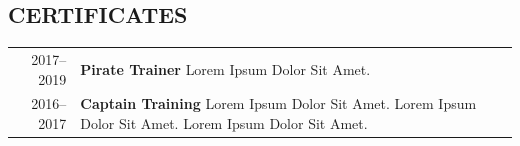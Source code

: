 \documentclass[11pt]{article}
\begin{document}
\vspace{2em}

        \subsection{CERTIFICATES} %
        \begin{tabular}{r p{}}
                {2017--2019} %
                & \textbf{Pirate Trainer} \newline %
                {Lorem Ipsum Dolor Sit Amet.} \\ %
                {2016--2017} %
                & \textbf{Captain Training} \newline %
                {Lorem Ipsum Dolor Sit Amet. Lorem Ipsum Dolor Sit Amet. \newline Lorem Ipsum Dolor Sit Amet.} \\ %
        \end{tabular}
        
    
\end{document}
